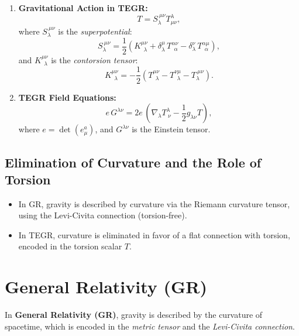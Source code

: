 \documentclass{article}
\begin{document}
\begin{enumerate}
    \item \textbf{Gravitational Action in TEGR:}
    \begin{equation}
        T = S_\lambda^{\ \mu\nu} T^\lambda_{\mu\nu},
    \end{equation}
    where $S_\lambda^{\ \mu\nu}$ is the \textit{superpotential}:
    \begin{equation}
        S_\lambda^{\ \mu\nu} = \frac{1}{2} \left( K^{\mu\nu}_{\ \ \lambda} + \delta^\mu_\lambda \, T^{\alpha \nu}_{\ \ \alpha} - \delta^\nu_\lambda \, T^{\alpha \mu}_{\ \ \alpha} \right),
    \end{equation}
    and $K^{\mu\nu}_{\ \ \lambda}$ is the \textit{contorsion tensor}:
    \begin{equation}
        K^{\mu\nu}_{\ \ \lambda} = -\frac{1}{2} \left( T^{\mu\nu}_{\ \ \lambda} - T^{\nu \mu}_{\ \ \lambda} - T_{\lambda}^{\ \mu\nu} \right).
    \end{equation}

    \item \textbf{TEGR Field Equations:}
    \begin{equation}
        e \, G^{\lambda \nu} = 2 e \, \left( \nabla_\lambda T^\lambda_{\ \nu} - \frac{1}{2} g_{\lambda \nu} T \right),
    \end{equation}
    where $e = \det(e^a_\mu)$, and $G^{\lambda \nu}$ is the Einstein tensor.
\end{enumerate}

\subsection*{Elimination of Curvature and the Role of Torsion}

\begin{itemize}
    \item In GR, gravity is described by curvature via the Riemann curvature tensor, using the Levi-Civita connection (torsion-free).
    \item In TEGR, curvature is eliminated in favor of a flat connection with torsion, encoded in the torsion scalar $T$.
\end{itemize}

\section*{General Relativity (GR)}

In \textbf{General Relativity (GR)}, gravity is described by the curvature of spacetime, which is encoded in the \textit{metric tensor} and the \textit{Levi-Civita connection}.
\end{document}
